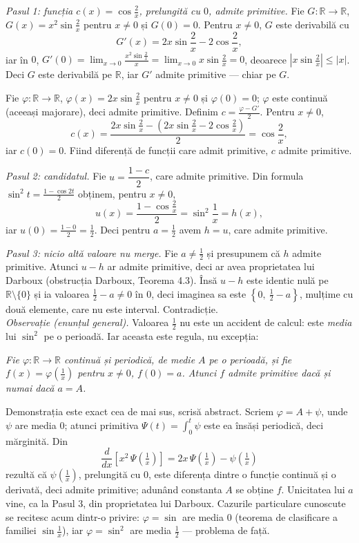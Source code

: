 \noindent\textit{Pasul 1: funcția $c(x)=\cos\frac2x$, prelungită cu $0$, admite
primitive.} Fie $G:\mathbb{R}\to\mathbb{R}$, $G(x)=x^2\sin\frac2x$ pentru $x\neq0$
și $G(0)=0$. Pentru $x\neq0$, $G$ este derivabilă cu
\[ G'(x) = 2x\sin\frac2x - 2\cos\frac2x , \]
iar în $0$,
$G'(0)=\lim_{x\to0}\frac{x^2\sin\frac2x}{x}=\lim_{x\to0}x\sin\frac2x = 0$,
deoarece $\left|x\sin\frac2x\right|\le|x|$. Deci $G$ este derivabilă pe
$\mathbb{R}$, iar $G'$ admite primitive --- chiar pe $G$.

Fie $\varphi:\mathbb{R}\to\mathbb{R}$, $\varphi(x)=2x\sin\frac2x$ pentru $x\neq0$
și $\varphi(0)=0$; $\varphi$ este continuă (aceeași majorare), deci admite
primitive. Definim $c=\frac{\varphi-G'}{2}$. Pentru $x\neq0$,
\[ c(x)=\frac{2x\sin\frac2x - \left(2x\sin\frac2x - 2\cos\frac2x\right)}{2}
=\cos\frac2x , \]
iar $c(0)=0$. Fiind diferență de funcții care admit primitive, $c$ admite
primitive.

\noindent\textit{Pasul 2: candidatul.} Fie $u=\dfrac{1-c}{2}$, care admite
primitive. Din formula $\sin^2 t = \frac{1-\cos 2t}{2}$ obținem, pentru $x\neq 0$,
\[ u(x) = \frac{1-\cos\frac2x}{2} = \sin^2\frac1x = h(x), \]
iar $u(0)=\frac{1-0}{2}=\frac12$. Deci pentru $a=\frac12$ avem $h=u$, care admite
primitive.

\noindent\textit{Pasul 3: nicio altă valoare nu merge.} Fie $a\neq\frac12$ și
presupunem că $h$ admite primitive. Atunci $u-h$ ar admite primitive, deci ar avea
proprietatea lui Darboux (obstrucția Darboux, Teorema 4.3). Însă $u-h$ este
identic nulă pe $\mathbb{R}\setminus\{0\}$ și ia valoarea $\frac12-a\neq0$ în $0$,
deci imaginea sa este $\left\{0,\ \frac12-a\right\}$, mulțime cu două elemente,
care nu este interval. Contradicție.\\[2pt]
\emph{Observație (enunțul general).} Valoarea $\frac12$ nu este un accident de
calcul: este \emph{media} lui $\sin^2$ pe o perioadă. Iar aceasta este regula, nu
excepția:

\emph{Fie $\varphi:\mathbb{R}\to\mathbb{R}$ continuă și periodică, de medie $A$ pe
o perioadă, și fie $f(x)=\varphi\!\left(\frac1x\right)$ pentru $x\neq0$, $f(0)=a$.
Atunci $f$ admite primitive dacă și numai dacă $a=A$.}

Demonstrația este exact cea de mai sus, scrisă abstract. Scriem
$\varphi=A+\psi$, unde $\psi$ are media $0$; atunci primitiva
$\Psi(t)=\int_0^t\psi$ este ea însăși periodică, deci mărginită. Din
\[ \frac{d}{dx}\left[x^2\,\Psi\!\left(\tfrac1x\right)\right]
   = 2x\,\Psi\!\left(\tfrac1x\right)-\psi\!\left(\tfrac1x\right) \]
rezultă că $\psi\!\left(\frac1x\right)$, prelungită cu $0$, este diferența dintre o
funcție continuă și o derivată, deci admite primitive; adunând constanta $A$ se
obține $f$. Unicitatea lui $a$ vine, ca la Pasul 3, din proprietatea lui Darboux.
Cazurile particulare cunoscute se recitesc acum dintr-o privire: $\varphi=\sin$ are
media $0$ (teorema de clasificare a familiei $\sin\frac1x$), iar $\varphi=\sin^2$
are media $\frac12$ --- problema de față.


